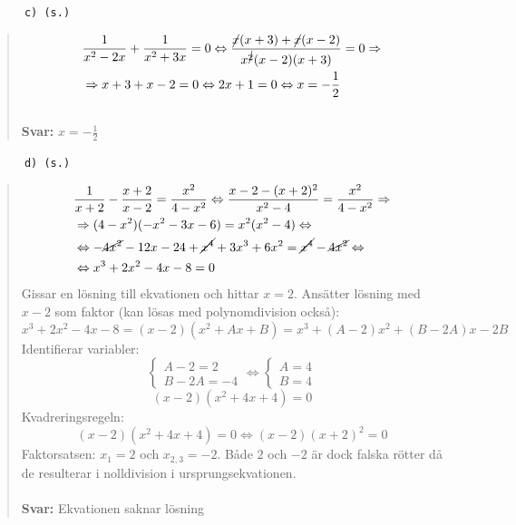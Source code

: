 \documentclass[a4paper]{article}
\newcommand{\tskcol}[1]{\textcolor{tskcol}{#1}}
\begin{document}
	\texttt{\tskcol{~~~~~~c) (s.)}}
	\begin{quotation}
		\noindent
		\begin{align*}
		&\dfrac{1}{x^2-2x}+\dfrac{1}{x^2+3x}=0 \Leftrightarrow 
		\dfrac{\cancel{x}(x+3)+\cancel{x}(x-2)}{x^{\cancel{2}}(x-2)(x+3)}=0 \Rightarrow \\
		&\Rightarrow x+3+x-2=0 \Leftrightarrow
		2x+1=0 \Leftrightarrow
		x=-\frac{1}{2}
		\end{align*}
		\\
		\textbf{Svar:} $x=-\frac{1}{2}$
	\end{quotation}
	
	\pagebreak
	\texttt{\tskcol{~~~~~~d) (s.)}}
	\begin{quotation}
		\noindent
		\begin{align*}
		&\dfrac{1}{x+2}-\dfrac{x+2}{x-2}=\dfrac{x^2}{4-x^2}\Leftrightarrow
		\dfrac{x-2-(x+2)^2}{x^2-4}=\dfrac{x^2}{4-x^2} \Rightarrow \\
		& \Rightarrow (4-x^2)(-x^2-3x-6)=x^2(x^2-4) \Leftrightarrow \\
		&\Leftrightarrow -\cancel{4x^2}-12x-24+\cancel{x^4}+3x^3+6x^2=\cancel{x^4}-\cancel{4x^2} \Leftrightarrow \\
		&\Leftrightarrow x^3+2x^2-4x-8=0
		\end{align*}
		Gissar en lösning till ekvationen och hittar $x=2$. Ansätter lösning med $x-2$ som faktor (kan lösas med polynomdivision också): 
		\[x^3+2x^2-4x-8=(x-2)(x^2+Ax+B)=x^3+(A-2)x^2+(B-2A)x-2B\]
		Identifierar variabler:
		\[\begin{cases}
		A-2=2 \\
		B-2A=-4
		\end{cases}
		\Leftrightarrow
		\begin{cases}
		A=4 \\
		B=4
		\end{cases}\]
		\[(x-2)(x^2+4x+4)=0\]
		Kvadreringsregeln:
		\[(x-2)(x^2+4x+4)=0\Leftrightarrow 
		(x-2)(x+2)^2=0\]
		Faktorsatsen: $x_1=2$ och $x_{2,3}=-2$.
		Både $2$ och $-2$ är dock falska rötter då de resulterar i nolldivision i ursprungsekvationen.
		\\ \\
		\textbf{Svar:} Ekvationen saknar lösning
	\end{quotation}
	
\end{document}
